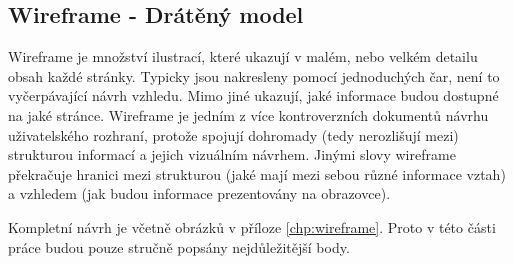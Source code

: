 \subsection{Wireframe - Drátěný model}
Wireframe je množství ilustrací, které ukazují v malém, nebo velkém detailu obsah každé stránky. Typicky jsou nakresleny pomocí jednoduchých čar, není to vyčerpávající návrh vzhledu. Mimo jiné ukazují, jaké informace budou dostupné na jaké stránce. Wireframe je jedním z více kontroverzních dokumentů návrhu uživatelského rozhraní, protože spojují dohromady (tedy nerozlišují mezi) strukturou informací a jejich vizuálním návrhem. Jinými slovy wireframe překračuje hranici mezi strukturou (jaké mají mezi sebou různé informace vztah) a vzhledem (jak budou informace prezentovány na obrazovce)\cite{brown2007communicating}.

Kompletní návrh je včetně obrázků v příloze \ref{chp:wireframe}. Proto v této části práce budou pouze stručně popsány nejdůležitější body.

